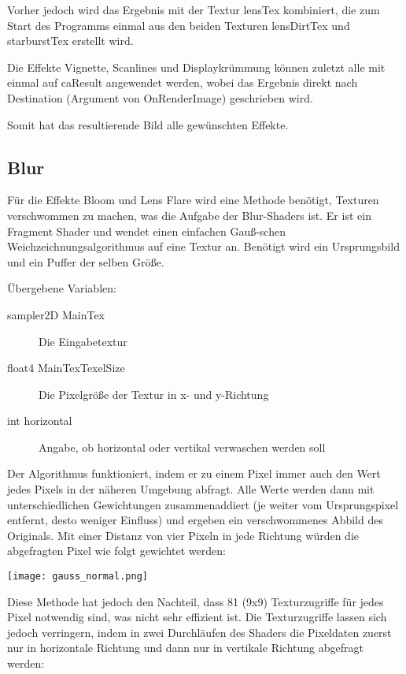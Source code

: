 
Vorher jedoch wird das Ergebnis mit der Textur lensTex kombiniert, die zum Start des Programms einmal aus den beiden Texturen lensDirtTex und starburstTex erstellt wird.


Die Effekte Vignette, Scanlines und Displaykrümmung können zuletzt alle mit einmal auf caResult angewendet werden, wobei das Ergebnis direkt nach Destination (Argument von OnRenderImage) geschrieben wird.


Somit hat das resultierende Bild alle gewünschten Effekte.




\subsection{Blur}

Für die Effekte Bloom und Lens Flare wird eine Methode benötigt, Texturen verschwommen zu machen, was die Aufgabe der Blur-Shaders ist.
Er ist ein Fragment Shader und wendet einen einfachen Gau{\ss}-schen Weichzeichnungsalgorithmus auf eine Textur an. Benötigt wird ein Ursprungsbild und ein Puffer der selben Grö{\ss}e.

Übergebene Variablen:
\begin{description}
\item[sampler2D MainTex] Die Eingabetextur
\item[float4 MainTexTexelSize] Die Pixelgröße der Textur in x- und y-Richtung
\item[int horizontal] Angabe, ob horizontal oder vertikal verwaschen werden soll
\end{description}

Der Algorithmus funktioniert, indem er zu einem Pixel immer auch den Wert jedes Pixels in der näheren Umgebung abfragt. Alle Werte werden dann mit unterschiedlichen Gewichtungen zusammenaddiert (je weiter vom Ursprungspixel entfernt, desto weniger Einfluss) und ergeben ein verschwommenes Abbild des Originals. Mit einer Distanz von vier Pixeln in jede Richtung würden die abgefragten Pixel wie folgt gewichtet werden:

\texttt{[image: gauss\_normal.png]}

Diese Methode hat jedoch den Nachteil, dass 81 (9x9) Texturzugriffe für jedes Pixel notwendig sind, was nicht sehr effizient ist.
Die Texturzugriffe lassen sich jedoch verringern, indem in zwei Durchläufen des Shaders die Pixeldaten zuerst nur in horizontale Richtung und dann nur in vertikale Richtung abgefragt werden:

